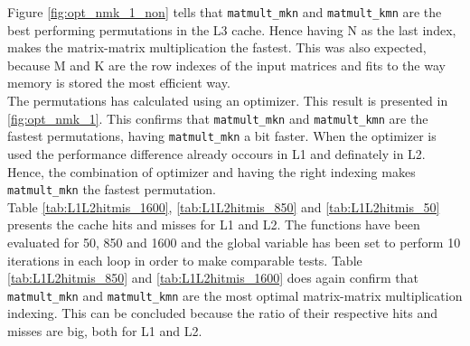 



Figure \ref{fig:opt_nmk_1_non} tells that \texttt{matmult\_mkn} and \texttt{matmult\_kmn} are the best performing permutations in the L3 cache. Hence having N as the last index, makes the matrix-matrix multiplication the fastest. This was also expected, because M and K are the row indexes of the input matrices and fits to the way memory is stored the most efficient way. \\
The permutations has calculated using an optimizer. This result is presented in \ref{fig:opt_nmk_1}. This confirms that \texttt{matmult\_mkn} and \texttt{matmult\_kmn} are the fastest permutations, having \texttt{matmult\_mkn} a bit faster. When the optimizer is used the performance difference already occours in L1 and definately in L2. Hence, the combination of optimizer and having the right indexing makes \texttt{matmult\_mkn} the fastest permutation. \\ 
Table \ref{tab:L1L2hitmis_1600}, \ref{tab:L1L2hitmis_850} and \ref{tab:L1L2hitmis_50} presents the cache hits and misses for L1 and L2.
The functions have been evaluated for 50, 850 and 1600 and the global variable \texttt{} has been set to perform 10 iterations in each loop in order to make comparable tests. Table \ref{tab:L1L2hitmis_850} and \ref{tab:L1L2hitmis_1600} does again confirm that \texttt{matmult\_mkn} and \texttt{matmult\_kmn} are the most optimal matrix-matrix multiplication indexing. This can be concluded because the ratio of their respective hits and misses are big, both for L1 and L2. 

